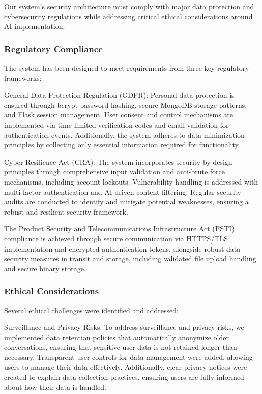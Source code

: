 \documentclass{article}
\begin{document}
Our system's security architecture must comply with major data protection and cybersecurity regulations while addressing critical ethical considerations around AI implementation.

\subsubsection{Regulatory Compliance}

The system has been designed to meet requirements from three key regulatory frameworks:

General Data Protection Regulation (GDPR): Personal data protection is ensured through bcrypt password hashing, secure MongoDB storage patterns, and Flask session management. User consent and control mechanisms are implemented via time-limited verification codes and email validation for authentication events. Additionally, the system adheres to data minimization principles by collecting only essential information required for functionality.

Cyber Resilience Act (CRA): The system incorporates security-by-design principles through comprehensive input validation and anti-brute force mechanisms, including account lockouts. Vulnerability handling is addressed with multi-factor authentication and AI-driven content filtering. Regular security audits are conducted to identify and mitigate potential weaknesses, ensuring a robust and resilient security framework.

The Product Security and Telecommunications Infrastructure Act (PSTI) compliance is achieved through secure communication via HTTPS/TLS implementation and encrypted authentication tokens, alongside robust data security measures in transit and storage, including validated file upload handling and secure binary storage.

\subsubsection{Ethical Considerations}

Several ethical challenges were identified and addressed:

Surveillance and Privacy Risks: To address surveillance and privacy risks, we implemented data retention policies that automatically anonymize older conversations, ensuring that sensitive user data is not retained longer than necessary. Transparent user controls for data management were added, allowing users to manage their data effectively. Additionally, clear privacy notices were created to explain data collection practices, ensuring users are fully informed about how their data is handled.
\end{document}
